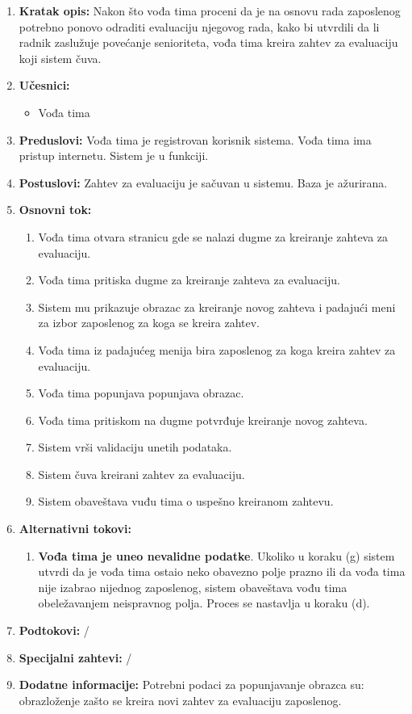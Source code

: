 \documentclass[a4paper]{article}
\begin{document}
\begin{enumerate}
    \item \textbf{Kratak opis:} Nakon što vođa tima proceni da je na osnovu rada zaposlenog potrebno ponovo odraditi evaluaciju njegovog rada, kako bi utvrdili da li radnik zaslužuje povećanje senioriteta, vođa tima kreira zahtev za evaluaciju koji sistem čuva.
    \item \textbf{Učesnici:}
        \begin{itemize}
            \item Vođa tima
        \end{itemize}
    \item \textbf{Preduslovi:} Vođa tima je registrovan korisnik sistema. Vođa tima ima pristup internetu. Sistem je u funkciji.
    \item \textbf{Postuslovi:} Zahtev za evaluaciju je sačuvan u sistemu. Baza je ažurirana.
    \item \textbf{Osnovni tok:}
        \begin{enumerate}
            \item Vođa tima otvara stranicu gde se nalazi dugme za kreiranje zahteva za evaluaciju.
            \item Vođa tima pritiska dugme za kreiranje zahteva za evaluaciju.
            \item Sistem mu prikazuje obrazac za kreiranje novog zahteva i padajući meni za izbor zaposlenog za koga se kreira zahtev.
            \item Vođa tima iz padajućeg menija bira zaposlenog za koga kreira zahtev za evaluaciju.
            \item Vođa tima popunjava popunjava obrazac.
            \item Vođa tima pritiskom na dugme potvrđuje kreiranje novog zahteva.
            \item Sistem vrši validaciju unetih podataka.
            \item Sistem čuva kreirani zahtev za evaluaciju.
            \item Sistem obaveštava vuđu tima o uspešno kreiranom zahtevu.
        \end{enumerate}
    \item \textbf{Alternativni tokovi:}
        \begin{enumerate}
            \item \textbf{Vođa tima je uneo nevalidne podatke}. Ukoliko u koraku (g) sistem utvrdi da je vođa tima ostaio neko obavezno polje prazno ili da vođa tima nije izabrao nijednog zaposlenog, sistem obaveštava vođu tima obeležavanjem neispravnog polja. Proces se nastavlja u koraku (d).
        \end{enumerate}
    \item \textbf{Podtokovi:} /
    \item \textbf{Specijalni zahtevi:} /
    \item \textbf{Dodatne informacije:} Potrebni podaci za popunjavanje obrazca su: obrazloženje zašto se kreira novi zahtev za evaluaciju zaposlenog.
\end{enumerate}
\end{document}
